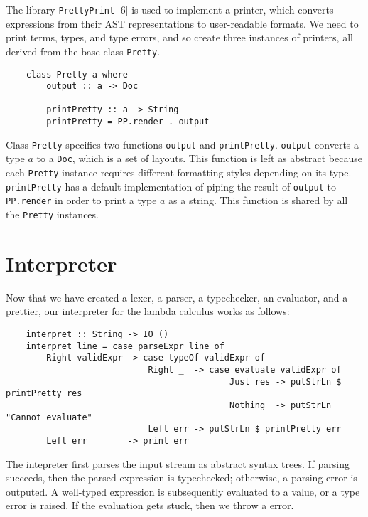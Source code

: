 \documentclass[fleqn, 11pt]{article}
\begin{document}
The library \texttt{PrettyPrint} [6] is used to implement a printer, which converts expressions from their AST representations to 
user-readable formats. We need to print terms, types, and type errors, and so create three instances of printers, all derived from 
the base class \texttt{Pretty}. 

\begin{Verbatim}
    class Pretty a where 
        output :: a -> Doc

        printPretty :: a -> String
        printPretty = PP.render . output
\end{Verbatim}

Class \texttt{Pretty} specifies two functions \texttt{output} and \texttt{printPretty}. \texttt{output} converts a type $a$ to a 
\texttt{Doc}, which is a set of layouts. This function is left as abstract because each  \texttt{Pretty} instance  
requires different formatting styles depending on its type. \texttt{printPretty} has a default implementation of 
piping the result of \texttt{output} to \texttt{PP.render} in order to print a type $a$ as a string. This function is shared by all 
the \texttt{Pretty} instances. 

\section{Interpreter} 

Now that we have created a lexer, a parser, a typechecker, an evaluator, and a prettier, our interpreter for the lambda 
calculus works as follows:

\begin{Verbatim}
    interpret :: String -> IO ()
    interpret line = case parseExpr line of 
        Right validExpr -> case typeOf validExpr of 
                            Right _  -> case evaluate validExpr of 
                                            Just res -> putStrLn $ printPretty res
                                            Nothing  -> putStrLn "Cannot evaluate"
                            Left err -> putStrLn $ printPretty err
        Left err        -> print err                    
\end{Verbatim}

The intepreter first parses the input stream as abstract syntax trees. If parsing succeeds, then the parsed expression is typechecked; otherwise, 
a parsing error is outputed. A well-typed expression is subsequently evaluated to a value, or a type error is raised. If the evaluation 
gets stuck, then we throw a  error.
\end{document}
